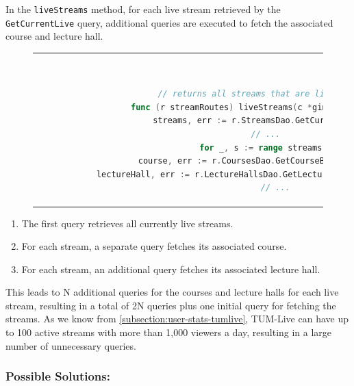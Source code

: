In the \texttt{liveStreams} method, for each live stream retrieved by the \texttt{GetCurrentLive} query, additional queries are executed to fetch the associated course and lecture hall.

\begin{figure}[htpb]
  \begin{tabular}{c}
  \ \small \begin{lstlisting}[language=Go]
    // returns all streams that are live
    func (r streamRoutes) liveStreams(c *gin.Context) {
        streams, err := r.StreamsDao.GetCurrentLive(c)
        // ...
        for _, s := range streams {
            course, err := r.CoursesDao.GetCourseById(c, s.CourseID)
            lectureHall, err := r.LectureHallsDao.GetLectureHallByID(s.LectureHallID)
            // ...
    \end{lstlisting}
  \end{tabular}
  \label{fig:n+1-example-livestreams}
\end{figure}

\begin{enumerate}
    \item The first query retrieves all currently live streams.
    \item For each stream, a separate query fetches its associated course.
    \item For each stream, an additional query fetches its associated lecture hall.
\end{enumerate}

\noindent This leads to N additional queries for the courses and lecture halls for each live stream, resulting in a total of 2N queries plus one initial query for fetching the streams. As we know from \autoref{subsection:user-stats-tumlive}, TUM-Live can have up to 100 active streams with more than 1,000 viewers a day, resulting in a large number of unnecessary queries.

\subsubsection{Possible Solutions:}

